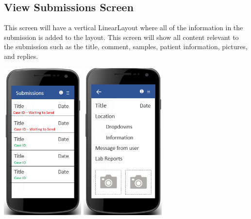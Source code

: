 \documentclass[onecolumn, draftclsnofoot, article, 10pt, compsoc]{IEEEtran}
\begin{document}
\subsection{View Submissions Screen}
This screen will have a vertical LinearLayout where all of the information in the submission is added to the layout. This screen will show all content relevant to the submission such as the title, comment, samples, patient information, pictures, and replies.
\newline
\begin{center}
\includegraphics[height=8cm]{submissionscreen.png}
\includegraphics[height=8cm]{detailsscreen.png}
\end{center}

\end{document}
